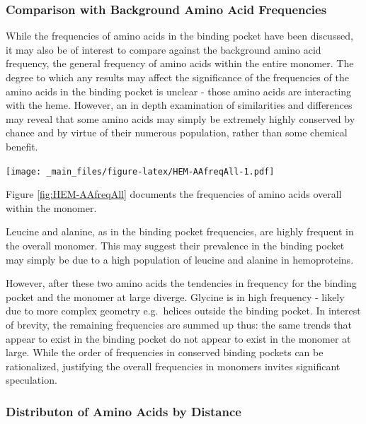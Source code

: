 \documentclass[a4paper, nobind]{templates/ociamthesis}
\let\origfigure\figure
\let\endorigfigure\endfigure
\renewenvironment{figure}[1][2] {
    \expandafter\origfigure\expandafter[H]
} {
    \endorigfigure
}
\begin{document}
\hypertarget{comparison-with-background-amino-acid-frequencies}{%
\subsubsection{Comparison with Background Amino Acid Frequencies}\label{comparison-with-background-amino-acid-frequencies}}

While the frequencies of amino acids in the binding pocket have been discussed, it may also be of interest to compare against the background amino acid frequency, the general frequency of amino acids within the entire monomer. The degree to which any results may affect the significance of the frequencies of the amino acids in the binding pocket is unclear - those amino acids are interacting with the heme. However, an in depth examination of similarities and differences may reveal that some amino acids may simply be extremely highly conserved by chance and by virtue of their numerous population, rather than some chemical benefit.

\begin{figure}
\centering
\texttt{[image: \_main\_files/figure-latex/HEM-AAfreqAll-1.pdf]}
\caption{\label{fig:HEM-AAfreqAll}HEM: AA Frequency of Monomer}
\end{figure}

Figure \ref{fig:HEM-AAfreqAll} documents the frequencies of amino acids overall within the monomer.

Leucine and alanine, as in the binding pocket frequencies, are highly frequent in the overall monomer. This may suggest their prevalence in the binding pocket may simply be due to a high population of leucine and alanine in hemoproteins.

However, after these two amino acids the tendencies in frequency for the binding pocket and the monomer at large diverge. Glycine is in high frequency - likely due to more complex geometry e.g.~helices outside the binding pocket. In interest of brevity, the remaining frequencies are summed up thus: the same trends that appear to exist in the binding pocket do not appear to exist in the monomer at large. While the order of frequencies in conserved binding pockets can be rationalized, justifying the overall frequencies in monomers invites significant speculation.

\hypertarget{distributon-of-amino-acids-by-distance}{%
\subsubsection{Distributon of Amino Acids by Distance}\label{distributon-of-amino-acids-by-distance}}
\end{document}
